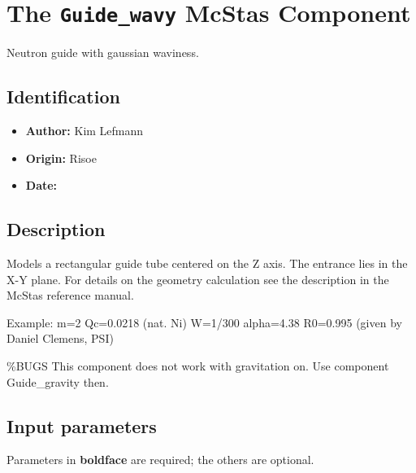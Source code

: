 \section{The \texttt{Guide\_wavy} McStas Component}
Neutron guide with gaussian waviness.

\subsection*{Identification}
\begin{itemize}
  \item \textbf{Author:} Kim Lefmann
  \item \textbf{Origin:} Risoe
  \item \textbf{Date:} 
\end{itemize}

\subsection*{Description}
Models a rectangular guide tube centered on the Z axis. The entrance lies in the X-Y plane. For details on the geometry calculation see the description in the McStas reference manual.

Example: m=2 Qc=0.0218 (nat. Ni) W=1/300 alpha=4.38 R0=0.995 (given by Daniel Clemens, PSI)

\%BUGS This component does not work with gravitation on. Use component Guide\_gravity then.

\subsection*{Input parameters}
Parameters in \textbf{boldface} are required; the others are optional.

